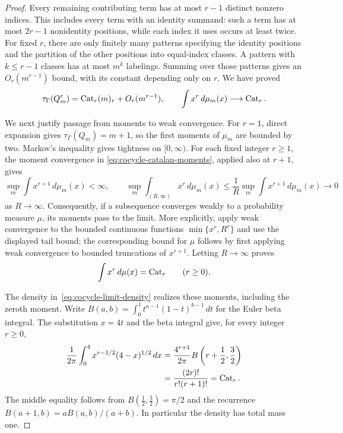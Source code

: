 \begin{proof}
Every remaining contributing term has at most $r-1$ distinct
nonzero indices.  This includes every term with an identity
summand: such a term has at most $2r-1$ nonidentity positions,
while each index it uses occurs at least twice.
For fixed $r$, there are only finitely many patterns specifying
the identity positions and the partition of the other positions
into equal-index classes.  A pattern with $k\leq r-1$ classes
has at most $m^k$ labelings.  Summing over those patterns gives
an $O_r(m^{r-1})$ bound, with its constant depending only on $r$.
We have proved
\begin{equation}
\label{eq:cocycle-catalan-moments}
  \tau_\Gamma(Q_m^r)
    =\operatorname{Cat}_r(m)_r+O_r(m^{r-1}),
  \qquad
  \int x^r\,d\mu_m(x)\longrightarrow\operatorname{Cat}_r.
\end{equation}

We next justify passage from moments to weak convergence.
For $r=1$, direct expansion gives
$\tau_\Gamma(Q_m)=m+1$, so the first moments of $\mu_m$ are
bounded by two.  Markov's inequality gives tightness on
$[0,\infty)$.
For each fixed integer $r\geq 1$, the moment convergence in
\eqref{eq:cocycle-catalan-moments}, applied also at $r+1$, gives
\[
  \sup_m\int x^{r+1}\,d\mu_m(x)<\infty,
  \qquad
  \sup_m\int_{(R,\infty)}x^r\,d\mu_m(x)
    \leq \frac{1}{R}\sup_m\int x^{r+1}\,d\mu_m(x)
    \longrightarrow 0
\]
as $R\to\infty$.
Consequently, if a subsequence converges weakly to a probability
measure $\mu$, its moments pass to the limit.
More explicitly, apply weak convergence to the bounded continuous
functions $\min\{x^r,R^r\}$ and use the displayed tail bound;
the corresponding bound for $\mu$ follows by first applying
weak convergence to bounded truncations of $x^{r+1}$.
Letting $R\to\infty$ proves
\begin{equation}
\label{eq:cocycle-subsequence-moments}
  \int x^r\,d\mu(x)=\operatorname{Cat}_r\qquad(r\geq 0).
\end{equation}

The density in~\eqref{eq:cocycle-limit-density} realizes these
moments, including the zeroth moment. Write
$B(a,b)=\int_0^1t^{a-1}(1-t)^{b-1}\,dt$ for the Euler beta integral.
The substitution
$x=4t$ and the beta integral give, for every integer $r\geq 0$,
\begin{align*}
  \frac{1}{2\pi}\int_0^4 x^{r-1/2}(4-x)^{1/2}\,dx
    &=\frac{4^{r+1}}{2\pi}
      B\left(r+\frac12,\frac32\right)\\
    &=\frac{(2r)!}{r!(r+1)!}
      =\operatorname{Cat}_r.
\end{align*}
The middle equality follows from
$B(\tfrac12,\tfrac32)=\pi/2$ and the recurrence
$B(a+1,b)=aB(a,b)/(a+b)$.
In particular the density has total mass one.


\end{proof}
